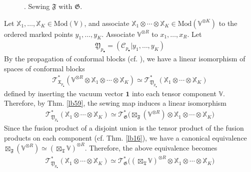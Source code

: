\documentclass[11pt,b5paper,notitlepage]{article}
\theoremstyle{definition}
\theoremstyle{plain}
\newcommand{\fk}{\mathfrak}
\newcommand{\idt}{\mathbf{1}}
\newcommand{\blt}{\bullet}
\newcommand{\Vbb}{\mathbb V}
\newcommand{\Xbb}{\mathbb X}
\newcommand{\<}{\left\langle}
\renewcommand{\>}{\right\rangle}
\newcommand{\MC}{\mathcal{C}}
\newcommand{\fx}{\mathfrak{X}}
\newcommand{\ST}{\mathscr{T}}
\newcommand{\Mod}{\mathrm{Mod}}
\newcommand{\fy}{\mathfrak{Y}}
\newcommand{\ff}{\mathfrak{F}}
\newcommand{\fg}{\mathfrak{G}}
\numberwithin{equation}{section}
\begin{document}
{{
}
}



\begin{figure}[h]

	\centering

\figb

	\caption{. Sewing $\ff$ with $\fg$.}
	\label{fig4}
\end{figure} 

Let $\Xbb_1,\dots,\Xbb_K\in\Mod(\Vbb)$, and associate $\Xbb_1\otimes\cdots\otimes\Xbb_K\in\Mod(\Vbb^{\otimes K})$ to the ordered marked points $y_1,\dots,y_K$. Associate $\Vbb^{\otimes R}$ to $x_1,\dots,x_R$. Let
\begin{align*}
\fk Y_{p_\blt}=(\MC_{p_\blt}|y_1,\dots,y_K)
\end{align*}
By the propagation of conformal blocks (cf. \cite[Cor. 2.44]{GZ1}), we have a linear isomorphism of spaces of conformal blocks
\begin{align*}
\ST^*_{\fx_{p_\blt}}(\Vbb^{\otimes R}\otimes\Xbb_1\otimes\cdots\otimes\Xbb_K)\simeq\ST^*_{\fy_{p_\blt}}(\Xbb_1\otimes\cdots\otimes\Xbb_K)
\end{align*}
defined by inserting the vacuum vector $\idt$ into each tensor component $\Vbb$. Therefore, by Thm. \ref{lb59}, the sewing map induces a linear isomorphism
\begin{gather*}
\ST^*_{\fy_{p_\blt}}(\Xbb_1\otimes\cdots\otimes\Xbb_K)\simeq\ST^*_\fg\big(\boxtimes_\ff(\Vbb^{\otimes R})\otimes\Xbb_1\otimes\cdots\otimes\Xbb_K\big)
\end{gather*}
Since the fusion product of a disjoint union is the tensor product of the fusion products on each component (cf. Thm. \ref{lb16}), we have a canonical equivalence $\boxtimes_\ff(\Vbb^{\otimes R})\simeq (\boxtimes_{\fk T}\Vbb)^{\otimes R}$. Therefore, the above equivalence becomes
\begin{align}\label{eq123}
\ST^*_{\fy_{p_\blt}}(\Xbb_1\otimes\cdots\otimes\Xbb_K)\simeq\ST^*_\fg\big((\boxtimes_{\fk T}\Vbb)^{\otimes R}\otimes\Xbb_1\otimes\cdots\otimes\Xbb_K\big)
\end{align}
\end{document}

